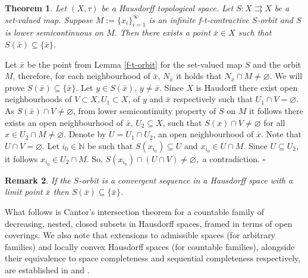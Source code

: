 \documentclass{article}
\renewcommand{\emptyset}{\varnothing}
\newcommand{\N}{\mathbb{N}}
\renewenvironment{proof}
         {\begin{trivlist}\item[
         {\bf Proof.}]}{{\hfill $\square$} \end{trivlist}}
\newtheorem{theo}{Theorem}[section]
\newtheorem{rem}[theo]{Remark}
\begin{document}
\begin{theo} \label{Hausdorff_Empty}
Let $(X, \tau)$ be a Hausdorff topological space. Let $S: X \rightrightarrows X$ be a set-valued map. Suppose $M:=\{x_i\}_{i=1}^{\infty}$ is an infinite f-t-contractive $S$-orbit and $S$ is lower semicontinuous on $M$. Then there exists a point $\bar{x} \in X$ such that $S(\bar{x}) \subseteq \{\bar{x}\}$.
\end{theo}
\begin{proof} 
Let $\bar{x}$ be the point from Lemma \ref{f-t-orbit} for the set-valued map $S$ and the orbit $M$, therefore, for each neighbourhood of $\bar{x}$, $N_{\bar{x}}$ it holds that $N_{\bar{x}} \cap M \neq \emptyset$. We will prove $S(\bar{x}) \subseteq \{\bar{x}\}$. Let $y \in S(\bar{x})$, $y \neq \bar{x}$. Since $X$ is Haudorff there exist open neighbourhoods of  $V\subset X, U_1 \subset X$, of $y$ and $\bar{x}$  respectively such that $U_1 \cap V = \emptyset$. As $S(\bar{x}) \cap V \neq \emptyset$, from lower semicontinuity property of $S$ on $M$ it follows there exists an open neighbourhood of $\bar{x}$, $U_2 \subseteq X$, such that $S(x) \cap V \neq \emptyset$ for all $x \in U_2 \cap M \neq \emptyset$. Denote by $U=U_1 \cap U_2$, an open neighbourhood of $\bar{x}$. Note that $U \cap V =\emptyset$. Let $i_0 \in \N$ be such that $S(x_{i_0}) \subseteq U$ and $x_{i_0} \in U \cap M$. Since $U \subseteq U_2$, it follows  $x_{i_0} \in U_2 \cap M$. So, $S(x_{i_0}) \cap (U \cap V) \neq \emptyset,$ a contradiction.
\end{proof}

\begin{rem}\label{rem2}
If the $S$-orbit is a convergent sequence in a Hausdorff space with a limit point $\bar{x}$ then $S(\bar{x}) \subseteq \{\bar{x}\}$.
\end{rem}

What follows is Cantor’s intersection theorem for a countable family of decreasing, nested, closed subsets in Hausdorff spaces, framed in terms of open coverings. We also note that extensions to admissible spaces (for arbitrary families) and locally convex Hausdorff spaces (for countable families), alongside their equivalence to space completeness and sequential completeness respectively, are established in \cite{Souza_Alves} and \cite{Baisnab_Saha}.
\end{document}
